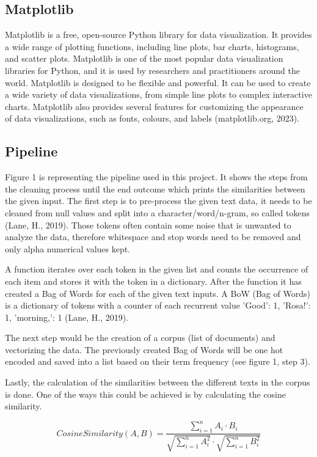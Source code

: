 \documentclass{article}
\begin{document}
\begin{multicols}{2}
\subsection{Matplotlib}
Matplotlib is a free, open-source Python library for data visualization. It provides a wide range of plotting functions, including line plots, bar charts, histograms, and scatter plots. Matplotlib is one of the most popular data visualization libraries for Python, and it is used by researchers and practitioners around the world. Matplotlib is designed to be flexible and powerful. It can be used to create a wide variety of data visualizations, from simple line plots to complex interactive charts. Matplotlib also provides several features for customizing the appearance of data visualizations, such as fonts, colours, and labels (matplotlib.org, 2023).

\subsection{Pipeline}

Figure 1 is representing the pipeline used in this project. It shows the steps from the cleaning process until the end outcome which prints the similarities between the given input. The first step is to pre-process the given text data, it needs to be cleaned from null values and split into a character/word/n-gram, so called tokens (Lane, H., 2019). Those tokens often contain some noise that is unwanted to analyze the data, therefore whitespace and stop words need to be removed and only alpha numerical values kept.

A function iterates over each token in the given list and counts the occurrence of each item and stores it with the token in a dictionary. After the function it has created a Bag of Words for each of the given text inputs. A BoW (Bag of Words) is a dictionary of tokens with a counter of each recurrent value {'Good': 1, 'Rosa!': 1, 'morning,': 1} (Lane, H., 2019).

The next step would be the creation of a corpus (list of documents) and vectorizing the data. The previously created Bag of Words will be one hot encoded and saved into a list based on their term frequency (see figure 1, step 3).

Lastly, the calculation of the similarities between the different texts in the corpus is done. One of the ways this could be achieved is by calculating the cosine similarity.

{
  \small
  \[Cosine Similarity (A, B) = \frac{{\sum\limits_{i=1}^{n} A_i \cdot B_i}}{{\sqrt{\sum\limits_{i=1}^{n} A_i^2} \cdot \sqrt{\sum\limits_{i=1}^{n} B_i^2}}}\]
}


\end{multicols}
\end{document}
